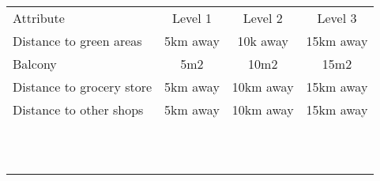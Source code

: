 \begin{table}[]
\begin{tabular}{@{}llll@{}}
Attribute                 & \multicolumn{1}{c}{Level 1}  & \multicolumn{1}{c}{Level 2}   & \multicolumn{1}{c}{Level 3}   \\
Distance to green areas   & \multicolumn{1}{c}{5km away} & \multicolumn{1}{c}{10k away}  & \multicolumn{1}{c}{15km away} \\
Balcony                   & \multicolumn{1}{c}{5m2}      & \multicolumn{1}{c}{10m2}      & \multicolumn{1}{c}{15m2}      \\
Distance to grocery store & \multicolumn{1}{c}{5km away} & \multicolumn{1}{c}{10km away} & \multicolumn{1}{c}{15km away} \\
Distance to other shops   & \multicolumn{1}{c}{5km away} & \multicolumn{1}{c}{10km away} & \multicolumn{1}{c}{15km away} \\
                          &                              &                               &                               \\
                          &                              &                               &                               \\
                          &                              &                               &                               \\
                          &                              &                               &                               \\
                          &                              &                               &                               \\
                          &                              &                               &                               \\
                          &                              &                               &                               \\
                          &                              &                               &                               \\
                          &                              &                               &                               \\
                          &                              &                               &                               \\
                          &                              &                               &                              
\end{tabular}
\end{table}